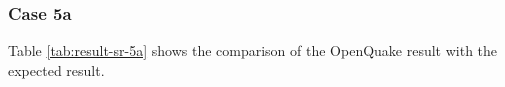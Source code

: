 \subsubsection{Case 5a}


Table \ref{tab:result-sr-5a} shows the comparison of the OpenQuake result with the expected result.